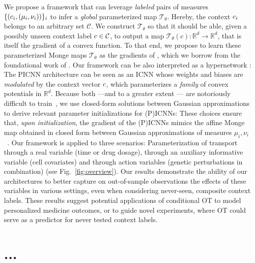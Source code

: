 We propose a framework that can leverage \textit{labeled} pairs of measures $\{(c_i, (\mu_i, \nu_i))\}_i$ to infer a \textit{global} parameterized map $\mathcal{T}_{\theta}$. 
Hereby, the context $c_i$ belongs to an arbitrary set $\mathcal{C}$. We construct $\mathcal{T}_{\theta}$ so that it should be able, given a possibly unseen context label $c\in{\mathcal{C}}$, to output a map $\mathcal{T}_{\theta}(c):\mathbb{R}^d\rightarrow\mathbb{R}^d$, that is itself the gradient of a convex function. To that end, we propose to learn these parameterized Monge maps $\mathcal{T}_{\theta}$ as the gradients of , which we borrow from the foundational work of \citet{amos2017input}. 
%
Our framework can be also interpreted as a hypernetwork \citep{ha2016hypernetworks}: The \acrshort{PICNN} architecture can be seen as an \acrshort{ICNN} whose weights and biases are \textit{modulated} by the context vector $c$, which parameterizes a \textit{family} of convex potentials in $\mathbb{R}^d$.
%
Because both  ---and to a greater extent --- are notoriously difficult to train~\citep{richter2021input,korotin2021wasserstein,korotin2021neural}, we use closed-form solutions between Gaussian approximations to derive relevant parameter initializations for (P)ICNNs:
These choices ensure that, \textit{upon initialization}, the gradient of the (P)ICNNs mimics the affine Monge map obtained in closed form between Gaussian approximations of measures $\mu_i,\nu_i$~\citep{gelbrich1990formula}.
%
Our framework is applied to three scenarios: Parameterization of transport through a real variable (time or drug dosage), through an auxiliary informative variable (cell covariates) and through action variables (genetic perturbations in combination) (see Fig.~\ref{fig:overview}). Our results demonstrate the ability of our architectures to better capture on out-of-sample observations the effects of these variables in various settings, even when considering never-seen, composite context labels. These results suggest potential applications of conditional OT to model personalized medicine outcomes, or to guide novel experiments, where OT could serve as a predictor for never tested context labels.

\section{...}



